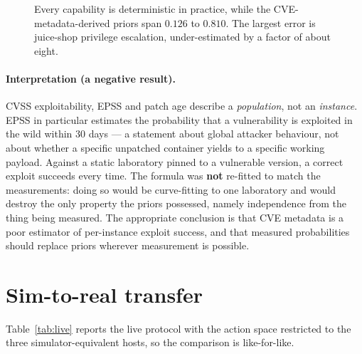 \documentclass[11pt,a4paper]{report}
\begin{document}
\begin{figure}[h]
\centering
{}
\caption{Every capability is deterministic in practice, while the
CVE-metadata-derived priors span $0.126$ to $0.810$. The largest error is
juice-shop privilege escalation, under-estimated by a factor of about eight.}
\label{fig:gap}
\end{figure}

\paragraph{Interpretation (a negative result).} CVSS exploitability, EPSS and
patch age describe a \emph{population}, not an \emph{instance}. EPSS in
particular estimates the probability that a vulnerability is exploited in the
wild within 30 days --- a statement about global attacker behaviour, not about
whether a specific unpatched container yields to a specific working payload.
Against a static laboratory pinned to a vulnerable version, a correct exploit
succeeds every time. The formula was \textbf{not} re-fitted to match the
measurements: doing so would be curve-fitting to one laboratory and would
destroy the only property the priors possessed, namely independence from the
thing being measured. The appropriate conclusion is that CVE metadata is a poor
estimator of per-instance exploit success, and that measured probabilities
should replace priors wherever measurement is possible.

\section{Sim-to-real transfer}
Table~\ref{tab:live} reports the live protocol with the action space restricted
to the three simulator-equivalent hosts, so the comparison is like-for-like.
\end{document}
